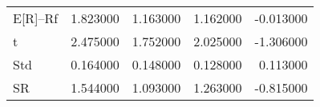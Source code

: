 \begin{tabular}{lrrrr}
\toprule
\midrule
E[R]--Rf & 1.823000 & 1.163000 & 1.162000 & -0.013000 \\
t & 2.475000 & 1.752000 & 2.025000 & -1.306000 \\
Std & 0.164000 & 0.148000 & 0.128000 & 0.113000 \\
SR & 1.544000 & 1.093000 & 1.263000 & -0.815000 \\
\bottomrule
\end{tabular}
